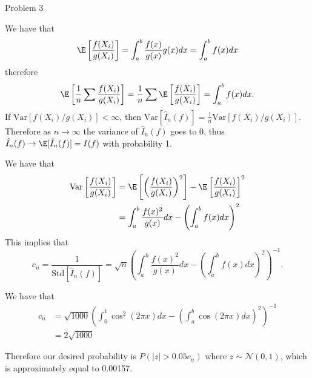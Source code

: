 \documentclass{article}
\begin{document}
\begin{question}{Problem 3}
    \begin{part}
        We have that 
        \[\E\left[\frac{f(X_i)}{g(X_i)}\right] = \int_a^b \frac{f(x)}{g(x)}g(x)dx = \int_a^b f(x)dx \]
        therefore
        \[\E\left[\frac{1}{n}\sum \frac{f(X_i)}{g(X_i)}\right] = \frac{1}{n}\sum \E\left[\frac{f(X_i)}{g(X_i)}\right] = \int_a^bf(x)dx. \]
        If $\mathrm{Var}[f(X_i)/g(X_i)] < \infty$, then $\mathrm{Var}[\hat{I}_n(f)] = \frac{1}{n}\mathrm{Var}[f(X_i)/g(X_i)]$. Therefore as $n\to\infty$ the variance of $\hat{I}_n(f)$ goes to 0, thus $\hat{I}_n(f) \to \E[\hat{I}_n(f)] = I(f)$ with probability 1. 
    \end{part}
    \begin{part}
        We have that 
        \begin{align*}
            \mathrm{Var}\left[\frac{f(X_i)}{g(X_i)}\right] &= \E\left[\left(\frac{f(X_i)}{g(X_i)}\right)^2\right] - \E\left[\frac{f(X_i)}{g(X_i)}\right]^2\\
                                                           &= \int_a^b\frac{f(x)^2}{g(x)}dx - \left(\int_a^bf(x)dx\right)^2
        \end{align*}
        This implies that 
        \[c_n = \frac{1}{\mathrm{Std}[\hat{I}_n(f)]} = \sqrt{n}\left(\int_a^b\frac{f(x)^2}{g(x)}dx - \left(\int_a^bf(x)dx\right)^2\right)^{-1}. \]

    \end{part}
    \begin{part}
        We have that 
        \begin{align*}
            c_n &= \sqrt{1000}\left(\int_0^1\cos^2(2\pi x)dx - \left(\int_a^b\cos (2\pi x) dx\right)^2\right)^{-1}\\
                &= 2\sqrt{1000}
        \end{align*}
    \end{part}
    Therefore our desired probability is $P(|z| > 0.05c_n)$ where $z\sim \mathcal{N}(0, 1)$, which is approximately equal to 0.00157. 
\end{question}


\end{document}
